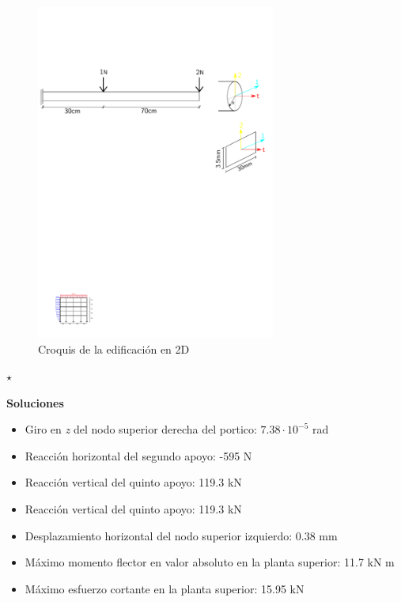 \documentclass[a4paper,12pt]{article}
\begin{document}
\begin{figure}[hb]
    \centering
\includegraphics[width=0.7\textwidth]{RecorteP10}
\caption{Croquis de la edificación en 2D}
\label{fig:croquis}
\end{figure}


\vspace{10mm}

\hspace{20mm}\hrulefill$\star$\hrulefill\hspace{20mm}

\textbf{Soluciones}\\

\begin{itemize}
\item Giro en \emph{z} del nodo superior derecha del portico: $7.38 \cdot 10^{-5}$ rad
\item Reacción horizontal del segundo apoyo: -595 N
\item Reacción vertical del quinto apoyo: 119.3 kN
\item Reacción vertical del quinto apoyo: 119.3 kN
\item Desplazamiento horizontal del nodo superior izquierdo: 0.38 mm
\item Máximo momento flector en valor absoluto en la planta superior: 11.7 kN m
\item Máximo esfuerzo cortante en la planta superior: 15.95 kN

\end{itemize}
\end{document}
